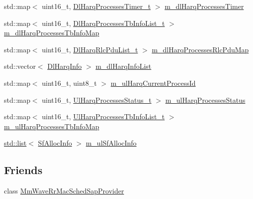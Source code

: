 \begin{DoxyCompactItemize}
\item 
std\+::map$<$ uint16\+\_\+t, \hyperlink{classns3_1_1MmWaveRrMacScheduler_a750009728f27d7ea202009e12cf7f6de}{Dl\+Harq\+Processes\+Timer\+\_\+t} $>$ \hyperlink{classns3_1_1MmWaveRrMacScheduler_aa52dc4680386f8ccf85d6b9c685463d1}{m\+\_\+dl\+Harq\+Processes\+Timer}
\item 
std\+::map$<$ uint16\+\_\+t, \hyperlink{classns3_1_1MmWaveRrMacScheduler_a0ca6ed6e2801f50786257fc6ef19a907}{Dl\+Harq\+Processes\+Tb\+Info\+List\+\_\+t} $>$ \hyperlink{classns3_1_1MmWaveRrMacScheduler_a8d14c222701c0a57ecbd40a51d0391da}{m\+\_\+dl\+Harq\+Processes\+Tb\+Info\+Map}
\item 
std\+::map$<$ uint16\+\_\+t, \hyperlink{classns3_1_1MmWaveRrMacScheduler_a1cd0bc1339970dc27da4f599233b911c}{Dl\+Harq\+Rlc\+Pdu\+List\+\_\+t} $>$ \hyperlink{classns3_1_1MmWaveRrMacScheduler_a51e5c8d3c34be4e070f2fb3e621cd418}{m\+\_\+dl\+Harq\+Processes\+Rlc\+Pdu\+Map}
\item 
std\+::vector$<$ \hyperlink{structns3_1_1DlHarqInfo}{Dl\+Harq\+Info} $>$ \hyperlink{classns3_1_1MmWaveRrMacScheduler_a1b1043d7f9994e2ee6a7e1b368e9d7a1}{m\+\_\+dl\+Harq\+Info\+List}
\item 
std\+::map$<$ uint16\+\_\+t, uint8\+\_\+t $>$ \hyperlink{classns3_1_1MmWaveRrMacScheduler_a9d9d27b704770d34cb1ce158e9ed51ba}{m\+\_\+ul\+Harq\+Current\+Process\+Id}
\item 
std\+::map$<$ uint16\+\_\+t, \hyperlink{classns3_1_1MmWaveRrMacScheduler_aaa0e5dc99185dddba2e9617f3bc8b9bd}{Ul\+Harq\+Processes\+Status\+\_\+t} $>$ \hyperlink{classns3_1_1MmWaveRrMacScheduler_af963cfe7e5dc36fce45c16d60b506465}{m\+\_\+ul\+Harq\+Processes\+Status}
\item 
std\+::map$<$ uint16\+\_\+t, \hyperlink{classns3_1_1MmWaveRrMacScheduler_a8be4bb7220253ad506048ff37620c7f1}{Ul\+Harq\+Processes\+Tb\+Info\+List\+\_\+t} $>$ \hyperlink{classns3_1_1MmWaveRrMacScheduler_a3fb20c8b0644fdd05f5545ec0b685b10}{m\+\_\+ul\+Harq\+Processes\+Tb\+Info\+Map}
\item 
\hyperlink{openflow-interface_8h_afd9bcfa176617760671b67580f536fa7}{std\+::list}$<$ \hyperlink{structns3_1_1SfAllocInfo}{Sf\+Alloc\+Info} $>$ \hyperlink{classns3_1_1MmWaveRrMacScheduler_a330485babfcd56bfbea128ebe3b66daa}{m\+\_\+ul\+Sf\+Alloc\+Info}
\end{DoxyCompactItemize}
\subsection*{Friends}
\begin{DoxyCompactItemize}
\item 
class \hyperlink{classns3_1_1MmWaveRrMacScheduler_a2753d5040bae8b11d6b7975e70a2c811}{Mm\+Wave\+Rr\+Mac\+Sched\+Sap\+Provider}
\end{DoxyCompactItemize}
